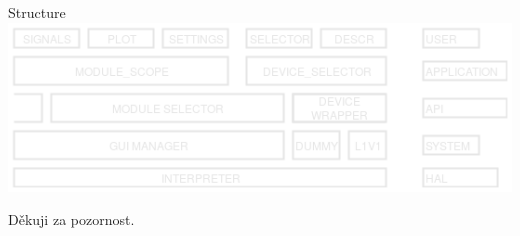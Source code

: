 \documentclass{beamer}
\begin{document}
	\begin{frame}{Structure}
		\includegraphics[width=0.9\paperwidth]{SWlayers.png}
	\end{frame}



\begin{frame}{}
	\Huge Děkuji za pozornost.
\end{frame}
\end{document}

